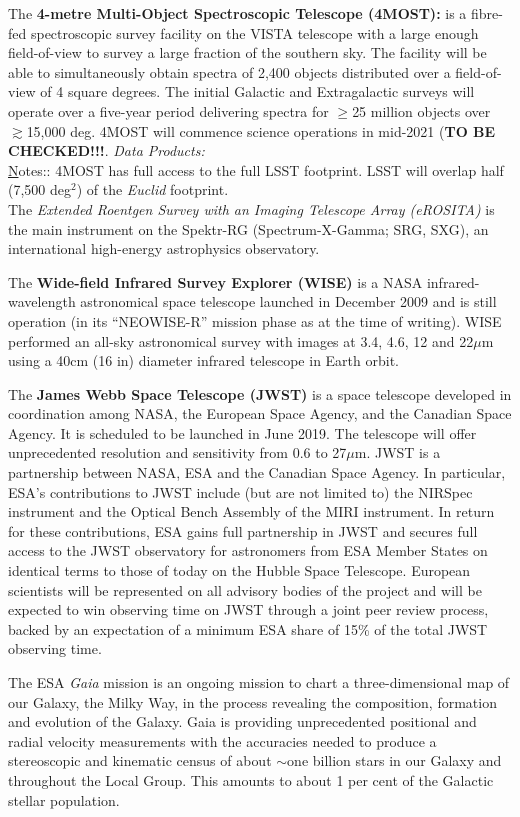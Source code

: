 \documentclass[11pt,a4paper]{article}
\begin{document}
\begin{framed}
The {\bf 4-metre Multi-Object Spectroscopic Telescope  (4MOST):} 
is a fibre-fed spectroscopic survey facility on the VISTA telescope with a large enough field-of-view to survey a large fraction of the southern sky. The facility will be able to simultaneously obtain spectra of 2,400 objects distributed over a field-of-view of 4 square degrees. 
The initial Galactic and Extragalactic surveys will operate over a five-year period delivering spectra for $\geq$25 million objects over 
$\gtrsim$15,000 deg. 4MOST will commence science operations in mid-2021 ({\bf TO BE CHECKED!!!}. 
{\it Data Products: } \\

{\underline Notes::} 4MOST has full access to the full LSST footprint. LSST will overlap half (7,500 deg$^2$) of the {\it Euclid} footprint. \\

The {\it Extended Roentgen Survey with an Imaging Telescope Array (eROSITA)} is the main instrument on the 
Spektr-RG (Spectrum-X-Gamma; SRG, SXG), an international high-energy astrophysics observatory. 


\hrulefill 

The {\bf Wide-field Infrared Survey Explorer (WISE)} is a NASA
infrared-wavelength astronomical space telescope launched in December
2009 and is still operation (in its ``NEOWISE-R'' mission phase as at
the time of writing). WISE performed an all-sky astronomical survey
with images at 3.4, 4.6, 12 and 22$\mu$m using a 40cm (16 in) diameter
infrared telescope in Earth orbit. 

The {\bf James Webb Space Telescope (JWST)} is a space telescope
developed in coordination among NASA, the European Space Agency, and
the Canadian Space Agency. It is scheduled to be launched in June
2019. The telescope will offer unprecedented resolution and
sensitivity from 0.6 to 27$\mu$m.
JWST is a partnership between NASA, ESA and the Canadian Space Agency.
In particular, ESA's contributions to JWST include (but are not
limited to) the NIRSpec instrument and the Optical Bench Assembly of
the MIRI instrument.  In return for these contributions, ESA gains
full partnership in JWST and secures full access to the JWST
observatory for astronomers from ESA Member States on identical terms
to those of today on the Hubble Space Telescope. European scientists
will be represented on all advisory bodies of the project and will be
expected to win observing time on JWST through a joint peer review
process, backed by an expectation of a minimum ESA share of 15\% of
the total JWST observing time.


The ESA {\it Gaia} mission is an ongoing mission to chart a
three-dimensional map of our Galaxy, the Milky Way, in the process
revealing the composition, formation and evolution of the Galaxy. Gaia
is providing unprecedented positional and radial velocity measurements
with the accuracies needed to produce a stereoscopic and kinematic
census of about $\sim$one billion stars in our Galaxy and throughout
the Local Group. This amounts to about 1 per cent of the Galactic
stellar population.



\end{framed}
\end{document}

